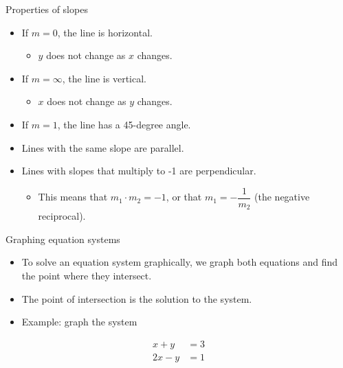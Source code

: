 \documentclass[
  10pt,
  ignorenonframetext,
]{beamer}
\providecommand{\tightlist}{%
  \setlength{\itemsep}{0pt}\setlength{\parskip}{0pt}}\usepackage{longtable,booktabs,array}
\begin{document}
\begin{frame}{Properties of slopes}
\label{properties-of-slopes}
\begin{itemize}
\item
  If \(m = 0\), the line is horizontal.

  \begin{itemize}
  \tightlist
  \item
    \(y\) does not change as \(x\) changes.
  \end{itemize}
\item
  If \(m = \infty\), the line is vertical.

  \begin{itemize}
  \tightlist
  \item
    \(x\) does not change as \(y\) changes.
  \end{itemize}
\item
  If \(m = 1\), the line has a 45-degree angle.
\item
  Lines with the same slope are parallel.
\item
  Lines with slopes that multiply to -1 are perpendicular.

  \begin{itemize}
  \tightlist
  \item
    This means that \(m_1 \cdot m_2 = -1\), or that
    \(m_1 = -\dfrac{1}{m_2}\) (the negative reciprocal).
  \end{itemize}
\end{itemize}
\end{frame}

\begin{frame}{Graphing equation systems}
\label{graphing-equation-systems}
\begin{itemize}
\item
  To solve an equation system graphically, we graph both equations and
  find the point where they intersect.
\item
  The point of intersection is the solution to the system.
\item
  Example: graph the system
\end{itemize}

\begin{align*}

x + y &= 3 \\

2x - y &= 1

\end{align*}
\end{frame}
\end{document}
